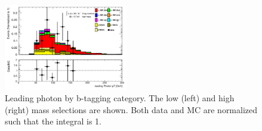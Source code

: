 \begin{figure}[p]
  \includegraphics[width=0.48\textwidth]{chapters/chapter5_yybb/images/data_MC_comparison/h_SR_h_2t_nominal_leadingPhoton_pt.pdf}
  \caption[Leading photon \pt.]{Leading photon \pt by b-tagging category. The low (left) and high (right) mass selections are shown. Both data and MC are normalized such that the integral is 1.
  \label{fig:photon_l_pt}}
\end{figure}

